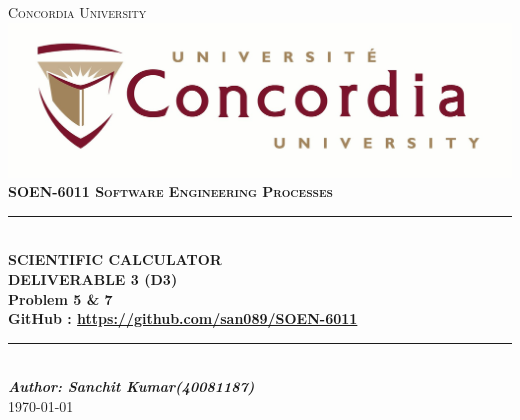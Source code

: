 \documentclass[a4paper,12pt]{article}
\newcommand{\Author}{Sanchit Kumar(40081187)}
\newcommand{\Course}{\textbf{SOEN-6011 \vspace{0.5cm} Software Engineering Processes}}
\begin{document}

\begin{titlepage}
\newcommand{\HRule}{\rule{\linewidth}{0.5mm}} %


\centering
\textsc{\LARGE Concordia University} \\ [5mm] 
\includegraphics[scale=.1]{University_logo.jpg}\\[1cm] 
\textsc{\Large \Course} \\ [0.5cm]

	
\HRule \\[0.4cm]
{ \huge \bfseries SCIENTIFIC CALCULATOR }\\[0.4cm] 
{\large \textbf{DELIVERABLE 3 (D3)} } \\ [0.2cm] 
{\large \textbf{Problem 5 \& 7} } \\ [0.2cm]
{\large \textbf{GitHub : \url{https://github.com/san089/SOEN-6011}}}	
\HRule \\[1.5cm]


\vspace{7cm}
\Large \emph{\textbf{Author: \Author}}\\
{\large \today}\\[2cm]

\vfill
\end{titlepage}	



\newpage
\end{document}
